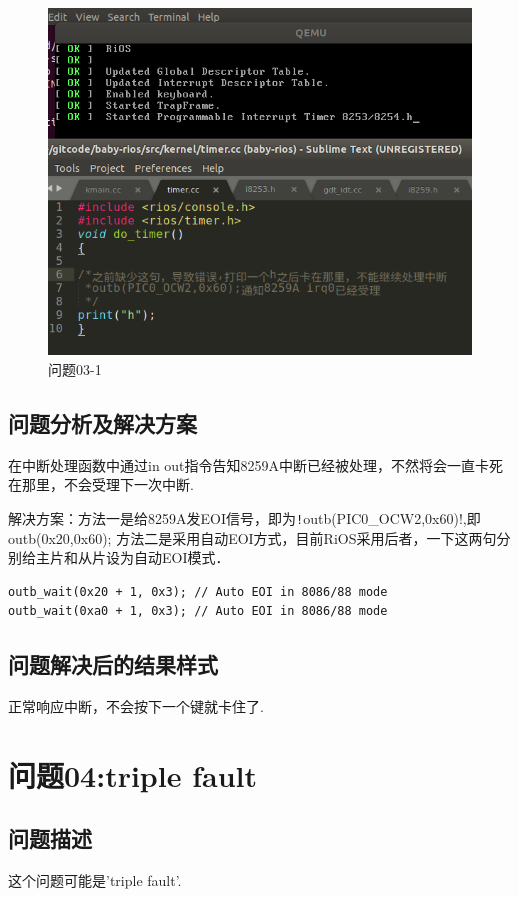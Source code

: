\begin{figure}[!htbp]
		\centering	\includegraphics[width=14cm]{pic/assets/problems/problem03_1}
        \caption{问题03-1}	\label{problem03_1}	\end{figure}

\subsection{问题分析及解决方案}
在中断处理函数中通过in out指令告知8259A中断已经被处理，不然将会一直卡死在那里，不会受理下一次中断.

解决方案：方法一是给8259A发EOI信号，即为\texttt!outb(PIC0_OCW2,0x60)!,即outb(0x20,0x60);
方法二是采用自动EOI方式，目前RiOS采用后者，一下这两句分别给主片和从片设为自动EOI模式．

\begin{verbatim}
outb_wait(0x20 + 1, 0x3); // Auto EOI in 8086/88 mode
outb_wait(0xa0 + 1, 0x3); // Auto EOI in 8086/88 mode
\end{verbatim}

\subsection{问题解决后的结果样式}
正常响应中断，不会按下一个键就卡住了.

\section{问题04:triple fault}
\subsection{问题描述}
这个问题可能是'triple fault'.

